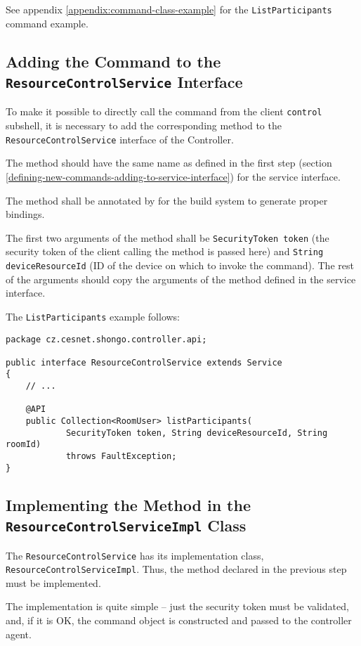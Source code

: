 \bigskip

See appendix \ref{appendix:command-class-example} for the \texttt{ListParticipants} command example.


\subsection{Adding the Command to the \texttt{ResourceControlService} Interface}

To make it possible to directly call the command from the client \texttt{control} subshell, it is necessary to add the corresponding method to the \texttt{ResourceControlService} interface of the Controller.

The method should have the same name as defined in the first step (section \ref{defining-new-commands-adding-to-service-interface}) for the service interface.

The method shall be annotated by \texttt{\@API} for the build system to generate proper bindings.

The first two arguments of the method shall be \texttt{SecurityToken token} (the security token of the client calling the method is passed here) and \texttt{String deviceResourceId} (ID of the device on which to invoke the command). The rest of the arguments should copy the arguments of the method defined in the service interface.

\bigskip

The \texttt{ListParticipants} example follows:
{ \small
\begin{verbatim}
package cz.cesnet.shongo.controller.api;

public interface ResourceControlService extends Service
{
    // ...

    @API
    public Collection<RoomUser> listParticipants(
            SecurityToken token, String deviceResourceId, String roomId)
            throws FaultException;
}
\end{verbatim}
}


\subsection{Implementing the Method in the \texttt{ResourceControlServiceImpl} Class}

The \texttt{ResourceControlService} has its implementation class, \texttt{ResourceControlServiceImpl}. Thus, the method declared in the previous step must be implemented.

The implementation is quite simple -- just the security token must be validated, and, if it is OK, the command object is constructed and passed to the controller agent.

